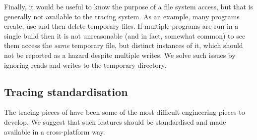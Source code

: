 Finally, it would be useful to know the purpose of a file system access, but that is generally not available to the tracing system. As an example, many programs create, use and then delete temporary files. If multiple programs are run in a single \Rattle build then it is not unreasonable (and in fact, somewhat common) to see them access the \emph{same} temporary file, but distinct instances of it, which should not be reported as a hazard despite multiple writes. We solve such issues by ignoring reads and writes to the temporary directory.

\subsection{Tracing standardisation}

The tracing pieces of \Rattle have been some of the most difficult engineering pieces to develop. We suggest that such features should be standardised and made available in a cross-platform way.
